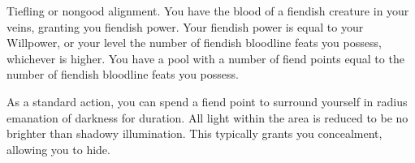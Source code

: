 \featpre Tiefling or nongood alignment.
\featben You have the blood of a fiendish creature in your veins, granting you fiendish power.
Your fiendish power is equal to your Willpower, or your level \add the number of fiendish bloodline feats you possess, whichever is higher.
You have a pool with a number of fiend points equal to the number of fiendish bloodline feats you possess.

As a standard action, you can spend a fiend point to surround yourself in \areamed radius emanation of darkness for \durshort duration.
All light within the area is reduced to be no brighter than shadowy illumination.
This typically grants you concealment, allowing you to hide.
